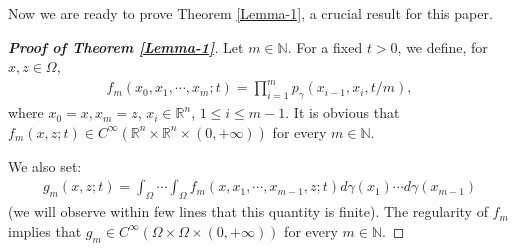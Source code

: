 \documentclass[12pt]{amsart}
\newtheorem{theorem}{Theorem}[section]
\newcommand{\R}{\mathbb R}
\newcommand{\N}{\mathbb N}
\newcommand{\1}{\mathbf 1}
\begin{document}
Now we are ready to prove Theorem \ref{Lemma-1}, a crucial result for this paper.

\begin{proof}[\bf Proof of Theorem \ref{Lemma-1}] Let $m\in\mathbb{N}$. For a fixed $t>0$, we define, for $x,z\in\Omega$,
\begin{align*}
f_m(x_0,x_1,\cdots,x_m;t)=\prod_{i=1}^{m}p_\gamma (x_{i-1},x_i,t/m),
\end{align*}
where $x_0=x,x_m=z$, $x_i\in \R^n$, $1\leq i\leq m-1$. It is obvious that $f_m(x,z;t)\in C^{\infty}(\R^n \times \R^n \times (0,+\infty))$ for every $m\in \N$.

We also set:
\begin{eqnarray*}
g_m(x,z;t)=\int_{\Omega}\cdots\int_{\Omega} f_m(x,x_1,\cdots,x_{m-1},z;t) d\gamma(x_1)\cdots d\gamma(x_{m-1})
\end{eqnarray*}
(we will observe within few lines that this quantity is finite). The regularity of $f_m$ implies that $g_m\in C^{\infty}(\Omega \times \Omega \times (0,+\infty))$ for every $m\in \N$.


\end{proof}
\end{document}
